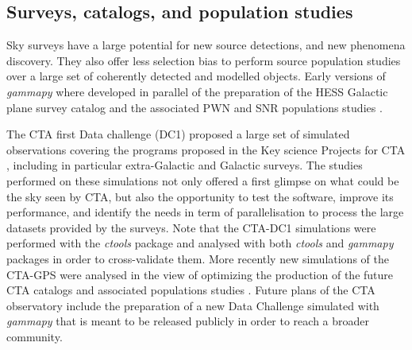 \subsection{Surveys, catalogs, and population studies}

Sky surveys have a large potential for new source detections, and new phenomena discovery. They also offer less selection bias to perform source population studies over a large set of coherently detected and modelled objects.
Early versions of \textit{gammapy} where developed in parallel of the preparation of the HESS Galactic plane survey catalog \citep[HGPS][]{2018A&A...612A...1H} and the associated PWN and SNR populations studies \citep{2018A&A...612A...2H, 2018A&A...612A...3H}.

The CTA first Data challenge (DC1) proposed a large set of simulated observations covering the programs proposed in the Key science Projects for CTA  \citep{2019scta.book.....C}, including in particular extra-Galactic and Galactic surveys.
The studies performed on these simulations not only offered a first glimpse on what could be the sky seen by CTA, but also the opportunity to test the software, improve its performance, and identify the needs in term of parallelisation to process the large datasets provided by the surveys. Note that the CTA-DC1 simulations were performed with the \textit{ctools} package \citep{2016A&A...593A...1K} and analysed with both \textit{ctools} and \textit{gammapy} packages in order to cross-validate them. More recently new simulations of the CTA-GPS were analysed in the view of optimizing the production of the future CTA catalogs and associated populations studies \citep{2021arXiv210903729R}.
Future plans of the CTA observatory include the preparation of a new Data Challenge simulated with \textit{gammapy} that is meant to be released publicly in order to reach a broader community.
